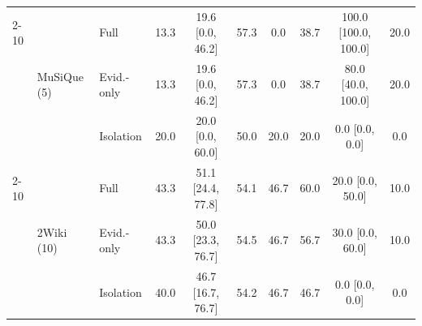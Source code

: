 \begin{table}[t]
{\begin{tabular}{lllccccccc}
\cmidrule(lr){2-10}
 & \multirow{3}{*}{MuSiQue (5)} & Full & 13.3 & 19.6 {\tiny[0.0, 46.2]} & 57.3 & 0.0 & 38.7 & 100.0 {\tiny[100.0, 100.0]} & 20.0 \\
 &  & Evid.-only & 13.3 & 19.6 {\tiny[0.0, 46.2]} & 57.3 & 0.0 & 38.7 & 80.0 {\tiny[40.0, 100.0]} & 20.0 \\
 &  & Isolation & 20.0 & 20.0 {\tiny[0.0, 60.0]} & 50.0 & 20.0 & 20.0 & 0.0 {\tiny[0.0, 0.0]} & 0.0 \\
\cmidrule(lr){2-10}
 & \multirow{3}{*}{2Wiki (10)} & Full & 43.3 & 51.1 {\tiny[24.4, 77.8]} & 54.1 & 46.7 & 60.0 & 20.0 {\tiny[0.0, 50.0]} & 10.0 \\
 &  & Evid.-only & 43.3 & 50.0 {\tiny[23.3, 76.7]} & 54.5 & 46.7 & 56.7 & 30.0 {\tiny[0.0, 60.0]} & 10.0 \\
 &  & Isolation & 40.0 & 46.7 {\tiny[16.7, 76.7]} & 54.2 & 46.7 & 46.7 & 0.0 {\tiny[0.0, 0.0]} & 0.0 \\
\bottomrule
\end{tabular}}
\end{table}